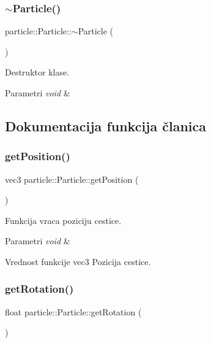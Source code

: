 \subsubsection{\texorpdfstring{$\sim$\+Particle()}{~Particle()}}
{\footnotesize\ttfamily particle\+::\+Particle\+::$\sim$\+Particle (\begin{DoxyParamCaption}{ }\end{DoxyParamCaption})}



Destruktor klase. 


\begin{DoxyParams}{Parametri}
{\em void} & \\
\hline
\end{DoxyParams}


\subsection{Dokumentacija funkcija članica}
\mbox{\label{classparticle_1_1Particle_a8dc9962f0f373739437652fbe8c5820d}} 
\subsubsection{\texorpdfstring{get\+Position()}{getPosition()}}
{\footnotesize\ttfamily vec3 particle\+::\+Particle\+::get\+Position (\begin{DoxyParamCaption}{ }\end{DoxyParamCaption})}



Funkcija vraca poziciju cestice. 


\begin{DoxyParams}{Parametri}
{\em void} & \\
\hline
\end{DoxyParams}
\begin{DoxyReturn}{Vrednost funkcije}
vec3 Pozicija cestice. 
\end{DoxyReturn}
\mbox{\label{classparticle_1_1Particle_a0a9002e65ea2db2f9e28935d3e3e9aa5}} 
\subsubsection{\texorpdfstring{get\+Rotation()}{getRotation()}}
{\footnotesize\ttfamily float particle\+::\+Particle\+::get\+Rotation (\begin{DoxyParamCaption}{ }\end{DoxyParamCaption})}



